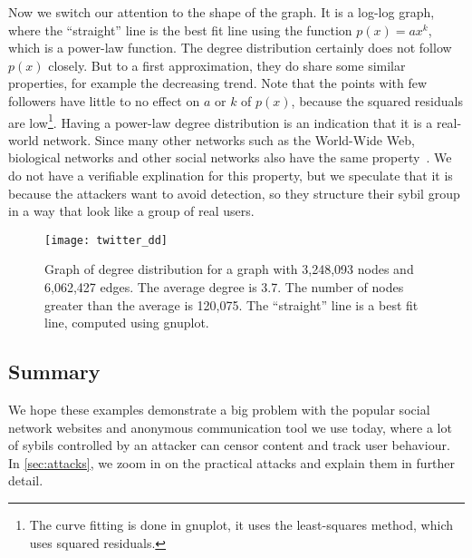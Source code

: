 Now we switch our attention to the shape of the graph. It is a log-log graph,
where the ``straight'' line is the best fit line using the function $p(x) =
ax^k$, which is a power-law function. The degree distribution certainly does not
follow $p(x)$ closely. But to a first approximation, they do share some similar
properties, for example the decreasing trend. Note that the points with few
followers have little to no effect on $a$ or $k$ of $p(x)$, because the squared
residuals are low\footnote{The curve fitting is done in gnuplot, it uses the
  least-squares method, which uses squared residuals.}. Having a power-law
degree distribution is an indication that it is a real-world network. Since many
other networks such as the World-Wide Web, biological networks and other social
networks also have the same property~\cite{girvan2002community}. We do not have
a verifiable explination for this property, but we speculate that it is because
the attackers want to avoid detection, so they structure their sybil group in a
way that look like a group of real users.


\begin{figure}
  \centering
  \texttt{[image: twitter\_dd]}
  \caption{Graph of degree distribution for a graph with 3,248,093 nodes and
    6,062,427 edges. The average degree is 3.7. The number of nodes greater than
    the average is 120,075. The ``straight'' line is a best fit line, computed
    using gnuplot.}
  \label{fig:twitter-dd}
\end{figure}

\subsection{Summary}
We hope these examples demonstrate a big problem with the popular social network
websites and anonymous communication tool we use today, where a lot of sybils
controlled by an attacker can censor content and track user behaviour. In
\autoref{sec:attacks}, we zoom in on the practical attacks and explain them in
further detail.

